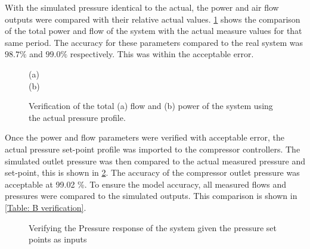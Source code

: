  	With the simulated pressure identical to the actual, the power and air flow outputs were compared with their relative actual values. \cref{fig: Verification Power kusasalethu} shows the comparison of the total power and flow of the system with the actual measure values for that same period. The accuracy for these parameters compared to the real system was $98.7 \%$ and $99.0 \%$ respectively. This was within the acceptable error. 
 
	\begin{figure}[h]
		\centering
		
		(a)\\
		
		(b)\\
		\caption{Verification of the total (a) flow and (b) power of the system using the actual pressure profile.}
		\label{fig: Verification Power kusasalethu}
	\end{figure}

	Once the power and flow parameters were verified with acceptable error, the actual pressure set-point profile was imported to the compressor controllers. The simulated outlet pressure was then compared to the actual measured pressure and set-point, this is shown in \cref{fig: Verification Pressure kusasalethu Setpoint}. The accuracy of the compressor outlet pressure was acceptable at 99.02 \%. To ensure the model accuracy, all measured flows and pressures were compared to the simulated outputs. This comparison is shown in \cref{Table: B verification}.

	\begin{figure}[h]
		\centering
		
		\caption{Verifying the Pressure response of the system given the pressure set points as inputs}
		\label{fig: Verification Pressure kusasalethu Setpoint}
	\end{figure}

